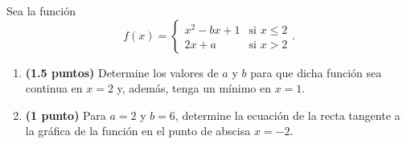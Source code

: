 
Sea la función
\[
f(x)=\begin{cases}x^2-bx+1&\text{si }x\leq2\\2x+a&\text{si }x>2\end{cases}.
\]
\begin{enumerate}[label=\alph*)]
\item \textbf{(1.5 puntos)} Determine los valores de $a$ y $b$ para que dicha función sea continua en $x=2$ y, además, tenga un mínimo en $x=1$.
\item \textbf{(1 punto)} Para $a=2$ y $b=6$, determine la ecuación de la recta tangente a la gráfica de la función en el punto de abscisa $x=-2$.
\end{enumerate}
